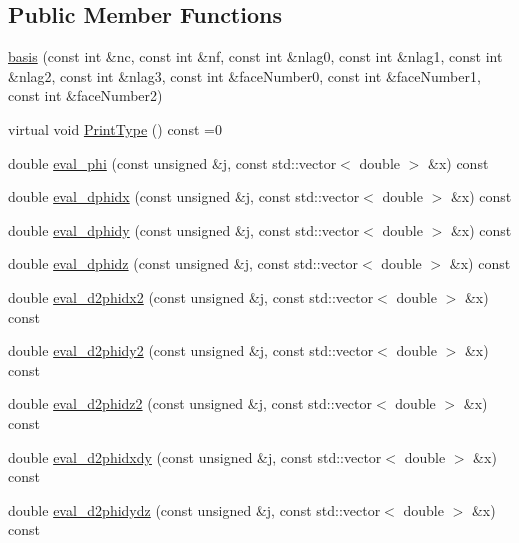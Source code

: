 \subsection*{Public Member Functions}
\begin{DoxyCompactItemize}
\item 
\mbox{\hyperlink{classfemus_1_1basis_a1e819ab49eb14b0727fb214ede9987c3}{basis}} (const int \&nc, const int \&nf, const int \&nlag0, const int \&nlag1, const int \&nlag2, const int \&nlag3, const int \&face\+Number0, const int \&face\+Number1, const int \&face\+Number2)
\item 
virtual void \mbox{\hyperlink{classfemus_1_1basis_abbae7bf8f31ec5793c911bc6d4ea0572}{Print\+Type}} () const =0
\item 
double \mbox{\hyperlink{classfemus_1_1basis_ac39cd1bad49bfe9370095558c24c4582}{eval\+\_\+phi}} (const unsigned \&j, const std\+::vector$<$ double $>$ \&x) const
\item 
double \mbox{\hyperlink{classfemus_1_1basis_af1cfe0c84a3a4b1e17b5903275410340}{eval\+\_\+dphidx}} (const unsigned \&j, const std\+::vector$<$ double $>$ \&x) const
\item 
double \mbox{\hyperlink{classfemus_1_1basis_a3c65ece3b826c56b2a05b2221e9ac61f}{eval\+\_\+dphidy}} (const unsigned \&j, const std\+::vector$<$ double $>$ \&x) const
\item 
double \mbox{\hyperlink{classfemus_1_1basis_a0a7e19ca2f5b312392bc34a64e8f2cf3}{eval\+\_\+dphidz}} (const unsigned \&j, const std\+::vector$<$ double $>$ \&x) const
\item 
double \mbox{\hyperlink{classfemus_1_1basis_af8e2384b8327ce9890851e3ae6447853}{eval\+\_\+d2phidx2}} (const unsigned \&j, const std\+::vector$<$ double $>$ \&x) const
\item 
double \mbox{\hyperlink{classfemus_1_1basis_abe4127967d317edfc852b0b0432fca98}{eval\+\_\+d2phidy2}} (const unsigned \&j, const std\+::vector$<$ double $>$ \&x) const
\item 
double \mbox{\hyperlink{classfemus_1_1basis_a9acc0a686ee2c3f77fd33b594c5e2ec3}{eval\+\_\+d2phidz2}} (const unsigned \&j, const std\+::vector$<$ double $>$ \&x) const
\item 
double \mbox{\hyperlink{classfemus_1_1basis_a9ebb6c277754a3f21be2f9b0f56428ff}{eval\+\_\+d2phidxdy}} (const unsigned \&j, const std\+::vector$<$ double $>$ \&x) const
\item 
double \mbox{\hyperlink{classfemus_1_1basis_af7ee9e4c4a8e6204e7504bb25c326d62}{eval\+\_\+d2phidydz}} (const unsigned \&j, const std\+::vector$<$ double $>$ \&x) const

\end{DoxyCompactItemize}
